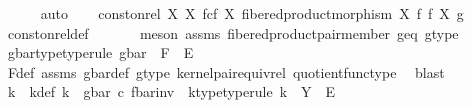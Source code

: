 \begin{isabellebody}
\ \ \ \ \isamarkupfalse%
\ auto\isanewline
\ \ \isamarkupfalse%
\ {\isachardoublequoteopen}const{\isacharunderscore}{\kern0pt}on{\isacharunderscore}{\kern0pt}rel\ X\ {\isacharparenleft}{\kern0pt}X\ \isactrlbsub f\isactrlesub {\isasymtimes}\isactrlsub c\isactrlbsub f\isactrlesub \ X{\isacharcomma}{\kern0pt}\ fibered{\isacharunderscore}{\kern0pt}product{\isacharunderscore}{\kern0pt}morphism\ X\ f\ f\ X{\isacharparenright}{\kern0pt}\ g{\isachardoublequoteclose}\isanewline
\ \ \ \ \isamarkupfalse%
\ const{\isacharunderscore}{\kern0pt}on{\isacharunderscore}{\kern0pt}rel{\isacharunderscore}{\kern0pt}def\ \isanewline
\ \ \ \ \isamarkupfalse%
\ {\isacharparenleft}{\kern0pt}meson\ assms{\isacharparenleft}{\kern0pt}{}{\isacharparenright}{\kern0pt}\ fibered{\isacharunderscore}{\kern0pt}product{\isacharunderscore}{\kern0pt}pair{\isacharunderscore}{\kern0pt}member{}\ g{\isacharunderscore}{\kern0pt}eq\ g{\isacharunderscore}{\kern0pt}type{\isacharparenright}{\kern0pt}\isanewline
\ \ \isamarkupfalse%
\ \isamarkupfalse%
\ g{\isacharunderscore}{\kern0pt}bar{\isacharunderscore}{\kern0pt}type{\isacharbrackleft}{\kern0pt}type{\isacharunderscore}{\kern0pt}rule{\isacharbrackright}{\kern0pt}{\isacharcolon}{\kern0pt}\ {\isachardoublequoteopen}g{\isacharunderscore}{\kern0pt}bar\ {\isacharcolon}{\kern0pt}\ F\ {\isasymrightarrow}\ E{\isachardoublequoteclose}\isanewline
\ \ \ \ \isamarkupfalse%
\ F{\isacharunderscore}{\kern0pt}def\ assms{\isacharparenleft}{\kern0pt}{}{\isacharparenright}{\kern0pt}\ g{\isacharunderscore}{\kern0pt}bar{\isacharunderscore}{\kern0pt}def\ g{\isacharunderscore}{\kern0pt}type\ kernel{\isacharunderscore}{\kern0pt}pair{\isacharunderscore}{\kern0pt}equiv{\isacharunderscore}{\kern0pt}rel\ quotient{\isacharunderscore}{\kern0pt}func{\isacharunderscore}{\kern0pt}type\ \isamarkupfalse%
\ blast\isanewline
\ \ \isamarkupfalse%
\ k\ \ k{\isacharunderscore}{\kern0pt}def{\isacharcolon}{\kern0pt}\ {\isachardoublequoteopen}k\ {\isacharequal}{\kern0pt}\ g{\isacharunderscore}{\kern0pt}bar\ {\isasymcirc}\isactrlsub c\ f{\isacharunderscore}{\kern0pt}bar{\isacharunderscore}{\kern0pt}inv{\isachardoublequoteclose}\ \ k{\isacharunderscore}{\kern0pt}type{\isacharbrackleft}{\kern0pt}type{\isacharunderscore}{\kern0pt}rule{\isacharbrackright}{\kern0pt}{\isacharcolon}{\kern0pt}\ {\isachardoublequoteopen}k\ {\isacharcolon}{\kern0pt}\ Y\ {\isasymrightarrow}\ E{\isachardoublequoteclose}\isanewline

\end{isabellebody}
